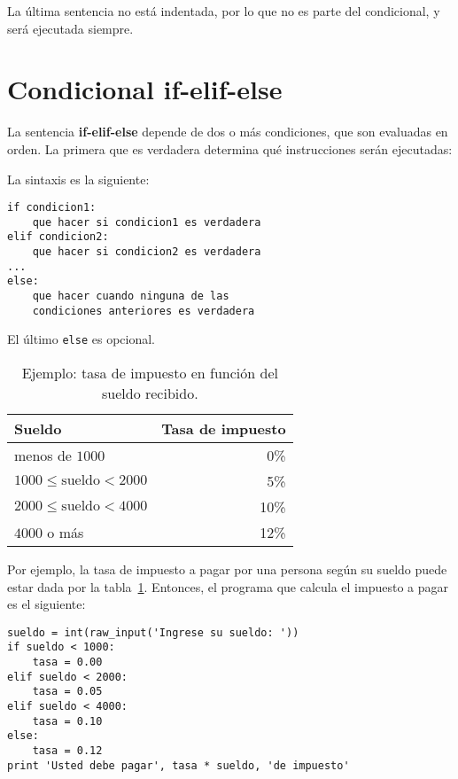 La última sentencia no está indentada, por lo que no es parte del
condicional, y será ejecutada siempre.

\section{Condicional if-elif-else}

La sentencia \textbf{if-elif-else} depende de dos o más condiciones, que
son eva\-lua\-das en orden. La primera que es verdadera determina qué
instrucciones serán ejecutadas:

\begin{center}
  
\end{center}

La sintaxis es la siguiente:

\begin{lstlisting}
if condicion1:
    que hacer si condicion1 es verdadera
elif condicion2:
    que hacer si condicion2 es verdadera
...
else:
    que hacer cuando ninguna de las
    condiciones anteriores es verdadera
\end{lstlisting}

El último \lstinline!else! es opcional.

\begin{table}
  \centering
  \begin{tabular}{lr}
    \toprule
      Sueldo & Tasa de impuesto \\
    \midrule
      menos de \(1000\)                 &  0\% \\
      \(1000 \le \text{sueldo} < 2000\) &  5\% \\
      \(2000 \le \text{sueldo} < 4000\) & 10\% \\
      \(4000\) o más                    & 12\% \\
    \bottomrule
  \end{tabular}
  \caption{Ejemplo: tasa de impuesto en función del sueldo recibido.}
  \label{tbl:tasa-impuesto}
\end{table}

Por ejemplo, la tasa de impuesto a pagar por una persona según su sueldo
puede estar dada por la tabla~\ref{tbl:tasa-impuesto}.
Entonces, el programa que calcula el impuesto a pagar es el siguiente:

\begin{lstlisting}
sueldo = int(raw_input('Ingrese su sueldo: '))
if sueldo < 1000:
    tasa = 0.00
elif sueldo < 2000:
    tasa = 0.05
elif sueldo < 4000:
    tasa = 0.10
else:
    tasa = 0.12
print 'Usted debe pagar', tasa * sueldo, 'de impuesto'
\end{lstlisting}

